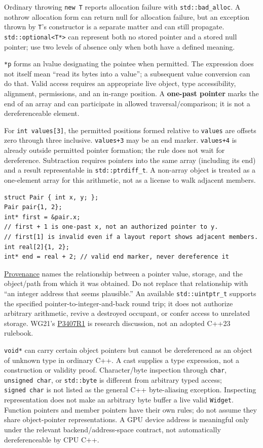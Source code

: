 Ordinary throwing \texttt{new\ T} reports allocation failure with \texttt{std::bad\_alloc}. A nothrow allocation form can return null for allocation failure, but an exception thrown by \texttt{T}'s constructor is a separate matter and can still propagate. \texttt{std::optional\textless{}T*\textgreater{}} can represent both no stored pointer and a stored null pointer; use two levels of absence only when both have a defined meaning.

\texttt{*p} forms an lvalue designating the pointee when permitted. The expression does not itself mean ``read its bytes into a value''; a subsequent value conversion can do that. Valid access requires an appropriate live object, type accessibility, alignment, permissions, and an in-range position. A \textbf{one-past pointer} marks the end of an array and can participate in allowed traversal/comparison; it is not a dereferenceable element.

For \texttt{int\ values{[}3{]}}, the permitted positions formed relative to \texttt{values} are offsets zero through three inclusive. \texttt{values+3} may be an end marker. \texttt{values+4} is already outside permitted pointer formation; the rule does not wait for dereference. Subtraction requires pointers into the same array (including its end) and a result representable in \texttt{std::ptrdiff\_t}. A non-array object is treated as a one-element array for this arithmetic, not as a license to walk adjacent members.

\begin{verbatim}
struct Pair { int x, y; };
Pair pair{1, 2};
int* first = &pair.x;
// first + 1 is one-past x, not an authorized pointer to y.
// first[1] is invalid even if a layout report shows adjacent members.
int real[2]{1, 2};
int* end = real + 2; // valid end marker, never dereference it
\end{verbatim}

\hyperref[appendix-6af5921bc853]{Provenance} names the relationship between a pointer value, storage, and the object/path from which it was obtained. Do not replace that relationship with ``an integer address that seems plausible.'' An available \texttt{std::uintptr\_t} supports the specified pointer-to-integer-and-back round trip; it does not authorize arbitrary arithmetic, revive a destroyed occupant, or confer access to unrelated storage. WG21's \href{https://www.open-std.org/jtc1/sc22/wg21/docs/papers/2025/p3407r1.html}{P3407R1} is research discussion, not an adopted C++23 rulebook.

\texttt{void*} can carry certain object pointers but cannot be dereferenced as an object of unknown type in ordinary C++. A cast supplies a type expression, not a construction or validity proof. Character/byte inspection through \texttt{char}, \texttt{unsigned\ char}, or \texttt{std::byte} is different from arbitrary typed access; \texttt{signed\ char} is not listed as the general C++ byte-aliasing exception. Inspecting representation does not make an arbitrary byte buffer a live valid \texttt{Widget}. Function pointers and member pointers have their own rules; do not assume they share object-pointer representations. A GPU device address is meaningful only under the relevant backend/address-space contract, not automatically dereferenceable by CPU C++.

